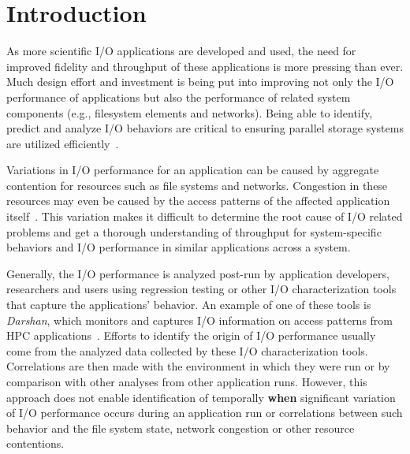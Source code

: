 \section{Introduction}
As more scientific I/O applications are developed and used, the need for
improved fidelity and throughput of these applications is more pressing than ever. 
Much design effort and investment is being put into improving not only
the I/O performance of applications but also the performance of related
system components (e.g., filesystem elements and networks). Being able to
identify, predict and analyze I/O behaviors are critical to ensuring
parallel storage systems are utilized efficiently~\cite{costa2021}. 


Variations in I/O performance for an application can be caused by 
aggregate contention for resources such as file systems and networks. 
Congestion in these resources may even be caused by the access patterns 
of the affected application itself~\cite{I/O-performance-variation}.
This variation
makes it difficult to determine the root cause of I/O related problems
and get a thorough understanding of throughput for system-specific
behaviors and I/O performance in similar applications across a
system. 

Generally, the I/O performance is analyzed post-run by application
developers, researchers and users using regression testing or
other I/O characterization tools that capture the applications' behavior. An example of one of these tools is \emph{Darshan}, which
monitors and captures I/O information on access patterns from HPC
applications~\cite{Darshan}.
Efforts to identify the origin of I/O performance usually come from the analyzed data 
collected by these I/O characterization tools. Correlations are then made with the environment 
in which they were run or by comparison with other analyses from 
other application runs.
However, this approach does not enable identification of
temporally \textbf{when} significant variation of I/O performance 
occurs during an application run or
correlations between such behavior and the file system state, 
network congestion or other resource contentions.

